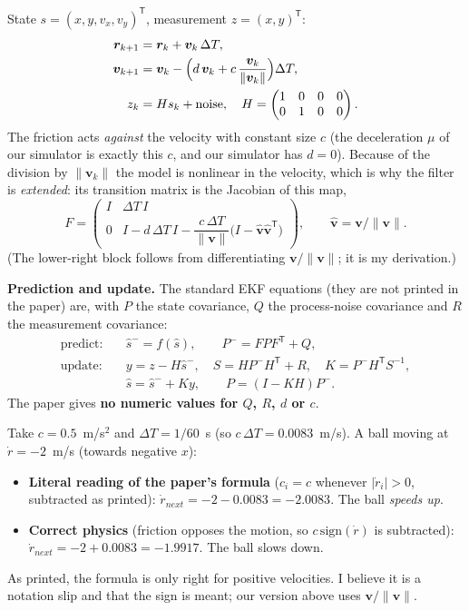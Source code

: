\documentclass[11pt,a4paper]{article}
\newcommand{\vv}{\bm{v}}
\begin{document}
\begin{eqbox}
State $s=(x,y,v_x,v_y)^{\mathsf T}$, measurement $z=(x,y)^{\mathsf T}$:
\[
\begin{aligned}
\bm r_{k+1}&=\bm r_k+\vv_k\,\Delta T,\\
\vv_{k+1}&=\vv_k-\Bigl(d\,\vv_k+c\,\frac{\vv_k}{\|\vv_k\|}\Bigr)\Delta T,\\
z_k&=H s_k+\text{noise},\quad H=\begin{pmatrix}1&0&0&0\\0&1&0&0\end{pmatrix}.
\end{aligned}
\]
The friction acts \emph{against} the velocity with constant size $c$ (the deceleration $\mu$ of our
simulator is exactly this $c$, and our simulator has $d=0$). Because of the division by
$\|\vv_k\|$ the model is nonlinear in the velocity, which is why the filter is \emph{extended}:
its transition matrix is the Jacobian of this map,
\[
F=\begin{pmatrix}I&\Delta T\,I\\0&I-d\,\Delta T\,I-\dfrac{c\,\Delta T}{\|\vv\|}\bigl(I-\hat{\vv}\hat{\vv}^{\mathsf T}\bigr)\end{pmatrix},\qquad \hat{\vv}=\vv/\|\vv\|.
\]
(The lower-right block follows from differentiating $\vv/\|\vv\|$; it is my derivation.)
\end{eqbox}

\textbf{Prediction and update.} The standard EKF equations (they are not printed in the paper)
are, with $P$ the state covariance, $Q$ the process-noise covariance and $R$ the measurement
covariance:
\[
\begin{aligned}
\text{predict:}\quad & \hat s^-=f(\hat s),\qquad P^-=F P F^{\mathsf T}+Q,\\
\text{update:}\quad & y=z-H\hat s^-,\quad S=HP^-H^{\mathsf T}+R,\quad K=P^-H^{\mathsf T}S^{-1},\\
& \hat s=\hat s^-+K y,\qquad P=(I-KH)P^-.
\end{aligned}
\]
The paper gives \textbf{no numeric values for $Q$, $R$, $d$ or $c$}.

\begin{toy}
Take $c=0.5$~m/s$^2$ and $\Delta T=1/60$~s (so $c\,\Delta T=0.0083$~m/s). A ball moving at
$\dot r=-2$~m/s (towards negative $x$):
\begin{itemize}
\item \textbf{Literal reading of the paper's formula} ($c_i=c$ whenever $|\dot r_i|>0$, subtracted as
printed): $\dot r_{next}=-2-0.0083=-2.0083$. The ball \emph{speeds up}.
\item \textbf{Correct physics} (friction opposes the motion, so $c\,\mathrm{sign}(\dot r)$ is
subtracted): $\dot r_{next}=-2+0.0083=-1.9917$. The ball slows down.
\end{itemize}
As printed, the formula is only right for positive velocities. I believe it is a notation slip and
that the sign is meant; our version above uses $\vv/\|\vv\|$.
\end{toy}
\end{document}
